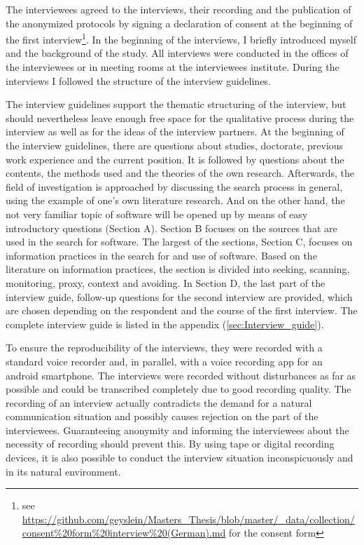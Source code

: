 \documentclass[12pt, a4paper, titlepage, oneside, abstract=true, toc=listof, toc=bibliography, BCOR=1cm]{scrreprt}
\begin{document}
The interviewees agreed to the interviews, their recording and the publication of the anonymized protocols by signing a declaration of consent at the beginning of the first interview\footnote{see \url{https://github.com/geyslein/Masters_Thesis/blob/master/_data/collection/consent\%20form\%20interview\%20(German).md} for the consent form}. In the beginning of the interviews, I briefly introduced myself and the background of the study. All interviews were conducted in the offices of the interviewees or in meeting rooms at the interviewees institute. During the interviews I followed the structure of the interview guidelines.

The interview guidelines support the thematic structuring of the interview, but should nevertheless leave enough free space for the qualitative process during the interview as well as for the ideas of the interview partners. At the beginning of the interview guidelines, there are questions about studies, doctorate, previous work experience and the current position. It is followed by questions about the contents, the methods used and the theories of the own research. Afterwards, the field of investigation is approached by discussing the search process in general, using the example of one's own literature research. And on the other hand, the not very familiar topic of software will be opened up by means of easy introductory questions (Section A).  Section B focuses on the sources that are used in the search for software. The largest of the sections, Section C, focuses on information practices in the search for and use of software. Based on the literature on information practices, the section is divided into seeking, scanning, monitoring, proxy, context and avoiding. In Section D, the last part of the interview guide, follow-up questions for the second interview are provided, which are chosen depending on the respondent and the course of the first interview. The complete interview guide is listed in the appendix (\ref{sec:Interview_guide}).

To ensure the reproducibility of the interviews, they were recorded with a standard voice recorder and, in parallel, with a voice recording app for an android smartphone. The interviews were recorded without disturbances as far as possible and could be transcribed completely due to good recording quality. The recording of an interview actually contradicts the demand for a natural communication situation and possibly causes rejection on the part of the interviewees. Guaranteeing anonymity and informing the interviewees about the necessity of recording should prevent this. By using tape or digital recording devices, it is also possible to conduct the interview situation inconspicuously and in its natural environment.
\end{document}
